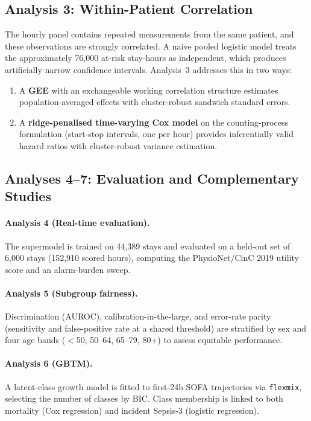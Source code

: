 \subsection{Analysis 3: Within-Patient Correlation}

The hourly panel contains repeated measurements from the same patient, and
these observations are strongly correlated. A naive pooled logistic model
treats the approximately 76{,}000 at-risk stay-hours as independent, which
produces artificially narrow confidence intervals. Analysis~3 addresses this in
two ways:

\begin{enumerate}
  \item A \textbf{GEE} with an exchangeable working correlation structure
  estimates population-averaged effects with cluster-robust sandwich standard
  errors.
  \item A \textbf{ridge-penalised time-varying Cox model} on the
  counting-process formulation (start-stop intervals, one per hour) provides
  inferentially valid hazard ratios with cluster-robust variance estimation.
\end{enumerate}

\subsection{Analyses 4--7: Evaluation and Complementary Studies}

\paragraph{Analysis 4 (Real-time evaluation).} The supermodel is trained on
44{,}389 stays and evaluated on a held-out set of 6{,}000 stays (152{,}910
scored hours), computing the PhysioNet/CinC 2019 utility score and an
alarm-burden sweep.

\paragraph{Analysis 5 (Subgroup fairness).} Discrimination (AUROC),
calibration-in-the-large, and error-rate parity (sensitivity and false-positive
rate at a shared threshold) are stratified by sex and four age bands ($<$50,
50--64, 65--79, 80+) to assess equitable performance.

\paragraph{Analysis 6 (GBTM).} A latent-class growth model
\cite{yang2022gbtm} is fitted to first-24h SOFA trajectories via
\texttt{flexmix}, selecting the number of classes by BIC. Class membership is
linked to both mortality (Cox regression) and incident Sepsis-3 (logistic
regression).

